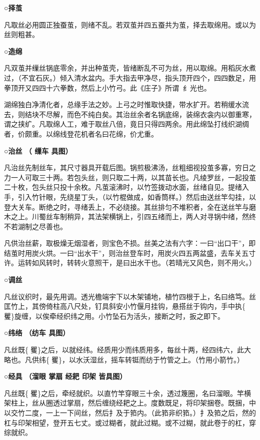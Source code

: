 \documentclass[]{article}
\begin{document}
\textbf{○择茧}

凡取丝必用圆正独蚕茧，则绪不乱。若双茧并四五蚕共为茧，择去取绵用。或以为丝则粗甚。

\textbf{○造绵}

凡双茧并缫丝锅底零余，并出种茧壳，皆绪断乱不可为丝，用以取绵。用稻灰水煮过，（不宜石灰。）倾入清水盆内。手大指去甲净尽，指头顶开四个，四四数足，用拳顶开又四四十六拳数，然后上小竹弓。此《庄子》所谓纟光也。

湖绵独白净清化者，总缘手法之妙。上弓之时惟取快捷，带水扩开。若稍缓水流去，则结块不尽解，而色不纯白矣。其治丝余者名锅底绵，装绵衣衾内以御重寒，谓之挟纩。凡取绵人工，难于取丝八倍，竟日只得四两余。用此绵坠打线织湖绸者，价颇重。以绵线登花机者名曰花绵，价尤重。

\textbf{○治丝 （ 缫车 具图）}

凡治丝先制丝车，其尺寸器具开载后图。锅煎极沸汤，丝粗细视投茧多寡，穷日之力一人可取三十两。若包头丝，则只取二十两，以其苗长也。凡绫罗丝，一起投茧二十枚，包头丝只投十余枚。凡茧滚沸时，以竹签拨动水面，丝绪自见。提绪入手，引入竹针眼，先绕星丁头，（以竹棍做成，如香筒样。）然后由送丝竿勾挂，以登大关车。断绝之时，寻绪丢上，不必绕接。其丝排匀不堆积者，全在送丝竿与磨木之上。川蜀丝车制稍异，其法架横锅上，引四五绪而上，两人对寻锅中绪，然终不若湖制之尽善也。

凡供治丝薪，取极燥无烟湿者，则宝色不损。丝美之法有六字：一曰``出口干''，即结茧时用炭火烘。一曰``出水干''，则治丝登车时，用炭火四五两盆盛，去车关五寸许。运转如风转时，转转火意照干，是曰出水干也。（若晴光又风色，则不用火。）

\textbf{○调丝}

凡丝议织时，最先用调。透光檐端宇下以木架铺地，植竹四根于上，名曰络笃。丝匡竹上，其傍倚柱高八尺处，钉具斜安小竹偃月挂钩，悬搭丝于钩内，手中执\{矍\}旋缠，以俟牵经织纬之用。小竹坠石为活头，接断之时，扳之即下。

\textbf{○纬络 （纺车 具图）}

凡丝既\{矍\}之后，以就经纬。经质用少而纬质用多，每丝十两，经四纬六，此大略也。凡供纬\{矍\}，以水沃湿丝，摇车转铤而纺于竹管之上。（竹用小箭竹。）

\textbf{○经具 （溜眼 掌扇 经耙 印架 皆具图）}

凡丝既\{矍\}之后，牵经就织。以直竹竿穿眼三十余，透过篾圈，名曰溜眼。竿横架柱上，丝从圈透过掌扇，然后缠绕经耙之上。度数既足，将印架捆卷。既捆，中以交竹二度，一上一下间丝，然后扌及于筘内。（此筘非织筘。）扌及筘之后，然的杠与印架相望，登开五七丈。或过糊者，就此过糊。或不过糊，就此卷于的杠，穿综就织。
\end{document}
